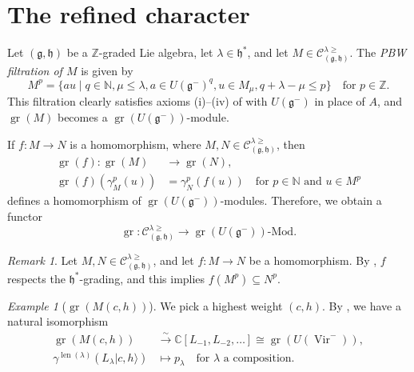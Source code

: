 \documentclass[a4paper, 12pt, reqno]{amsart}
\theoremstyle{remark}
\newtheorem{remark}[theorem]{Remark}
\newtheorem{example}[theorem]{Example}
\DeclareMathOperator{\Vir}{Vir}
\DeclareMathOperator{\len}{len}
\DeclareMathOperator{\gr}{gr}
\begin{document}
\section{The refined character}
\label{sec:refined-character}

Let $(\mathfrak{g}, \mathfrak{h})$ be a $\mathbb{Z}$-graded Lie algebra, let $\lambda \in \mathfrak{h}^*$, and let $M \in \mathcal{C}^{\lambda \ge}_{(\mathfrak{g}, \mathfrak{h})}$.
The \emph{PBW filtration of $M$} is given by
\begin{equation*}
  M^p = \{au \mid q \in \mathbb{N}, \mu \le \lambda, a \in U(\mathfrak{g}^-)^q, u \in M_{\mu}, q + \lambda - \mu \le p\} \quad \text{for $p \in \mathbb{Z}$}.
\end{equation*}
This filtration clearly satisfies axioms (i)--(iv) of  with $U(\mathfrak{g}^-)$ in place of $A$, and $\gr(M)$ becomes a $\gr(U(\mathfrak{g^-}))$-module.

If $f: M \to N$ is a homomorphism, where $M, N \in \mathcal{C}^{\lambda \ge}_{(\mathfrak{g}, \mathfrak{h})}$, then
\begin{align*}
  \gr(f): \gr(M) &\to \gr(N), \\
  \gr(f)(\gamma_M^p(u)) &= \gamma_N^p(f(u)) \quad \text{for $p \in \mathbb{N}$ and $u \in M^p$}
\end{align*}
defines a homomorphism of $\gr(U(\mathfrak{g}^-))$-modules.
Therefore, we obtain a functor
\begin{equation*}
  \gr: \mathcal{C}^{\lambda \ge}_{(\mathfrak{g}, \mathfrak{h})} \to \text{$\gr(U(\mathfrak{g}^-))$-Mod}.
\end{equation*}

\begin{remark}
  \label{rmk:2}
  Let $M, N \in \mathcal{C}^{\lambda \ge}_{(\mathfrak{g}, \mathfrak{h})}$, and let $f: M \to N$ be a homomorphism.
  By , $f$ respects the $\mathfrak{h}^*$-grading, and this implies $f(M^p) \subseteq N^p$.
\end{remark}

\begin{example}[$\gr(M(c, h))$]
  \label{exa:4}
  We pick a highest weight $(c, h)$.
  By \cite[\S2]{dixmier_enveloping_1996}, we have a natural isomorphism
  \begin{align*}
    \gr(M(c, h)) &\xrightarrow{\sim} \mathbb{C}[L_{-1}, L_{-2}, \dots] \cong \gr(U(\Vir^-)), \\
    \gamma^{\len(\lambda)}(L_{\lambda}|c, h\rangle) & \mapsto p_{\lambda} \quad \text{for $\lambda$ a composition}.
  \end{align*}
\end{example}
\end{document}

